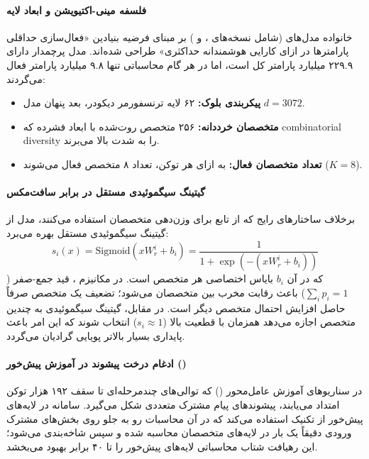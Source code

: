 \item {}

\paragraph*{فلسفه مینی-اکتیویشن و ابعاد لایه }
خانواده مدل‌های  \cite{minimax2026m2} (شامل نسخه‌های ،  و ) بر مبنای فرضیه بنیادین «فعال‌سازی حداقلی پارامترها در ازای کارایی هوشمندانه حداکثری» طراحی شده‌اند. مدل پرچمدار  دارای ۲۲۹.۹ میلیارد پارامتر کل است، اما در هر گام محاسباتی تنها ۹.۸ میلیارد پارامتر فعال می‌گردند:
\begin{itemize}
    \item \textbf{پیکربندی بلوک:} ۶۲ لایه ترنسفورمر دیکودر، بعد پنهان مدل $d = 3072$.
    \item \textbf{متخصصان خرددانه:} ۲۵۶ متخصص روت‌شده با ابعاد فشرده که combinatorial diversity را به شدت بالا می‌برند.
    \item \textbf{تعداد متخصصان فعال:} به ازای هر توکن، تعداد ۸ متخصص فعال می‌شوند ($K = 8$).
\end{itemize}

\paragraph*{گیتینگ سیگموئیدی مستقل در برابر سافت‌مکس}
برخلاف ساختارهای رایج که از تابع  برای وزن‌دهی متخصصان استفاده می‌کنند، مدل  از گیتینگ سیگموئیدی مستقل بهره می‌برد:
\begin{equation}
    s_i(x) = \text{Sigmoid}(x W_r^i + b_i) = \frac{1}{1 + \exp\left(-(x W_r^i + b_i)\right)}
\end{equation}
که در آن $b_i$ بایاس اختصاصی هر متخصص است. در مکانیزم ، قید جمع-صفر ($\sum_i p_i = 1$) باعث رقابت مخرب بین متخصصان می‌شود؛ تضعیف یک متخصص صرفاً حاصل افزایش احتمال متخصص دیگر است. در مقابل، گیتینگ سیگموئیدی به چندین متخصص اجازه می‌دهد همزمان با قطعیت بالا ($s_i \approx 1$) انتخاب شوند که این امر باعث پایداری بسیار بالاتر پویایی گرادیان می‌گردد.

\paragraph*{ادغام درخت پیشوند در آموزش پیش‌خور ()}
در سناریوهای آموزش عامل‌محور () که توالی‌های چندمرحله‌ای تا سقف ۱۹۲ هزار توکن امتداد می‌یابند، پیشوندهای پیام مشترک متعددی شکل می‌گیرد. سامانه  در لایه‌های پیش‌خور از تکنیک  استفاده می‌کند که در آن محاسبات رو به جلو روی بخش‌های مشترک ورودی دقیقاً یک بار در لایه‌های متخصصان محاسبه شده و سپس شاخه‌بندی می‌شود؛ این رهیافت شتاب محاسباتی لایه‌های پیش‌خور را تا ۴۰ برابر بهبود می‌بخشد.

